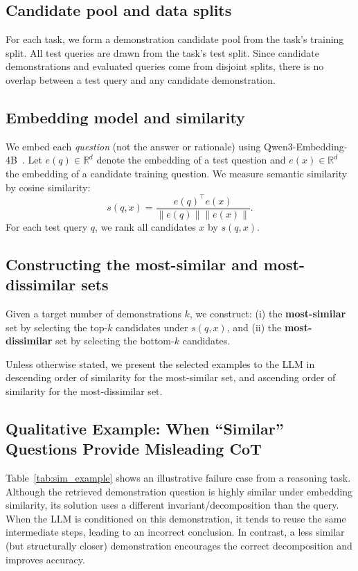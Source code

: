 \documentclass{article}
\theoremstyle{plain}
\theoremstyle{definition}
\theoremstyle{remark}
\begin{document}
\subsection{Candidate pool and data splits}
For each task, we form a demonstration candidate pool from the task's training split. All test queries are drawn from the task's test split.  Since candidate demonstrations and evaluated queries come from disjoint splits, there is no overlap between a test query and any candidate demonstration.

\subsection{Embedding model and similarity}
We embed each \emph{question} (not the answer or rationale) using Qwen3-Embedding-4B~\cite{zhang2025qwen3embeddingadvancingtext}.
Let $e(q)\in\mathbb{R}^d$ denote the embedding of a test question and $e(x)\in\mathbb{R}^d$ the embedding of a candidate training question.
We measure semantic similarity by cosine similarity:
\[
s(q,x) = \frac{e(q)^\top e(x)}{\|e(q)\|\|e(x)\|}.
\]
For each test query $q$, we rank all candidates $x$ by $s(q,x)$.

\subsection{Constructing the most-similar and most-dissimilar sets}
Given a target number of demonstrations $k$, we construct:
(i) the \textbf{most-similar} set by selecting the top-$k$ candidates under $s(q,x)$, and
(ii) the \textbf{most-dissimilar} set by selecting the bottom-$k$ candidates.

Unless otherwise stated, we present the selected examples to the LLM in descending order of similarity for the most-similar set, and ascending order of similarity for the most-dissimilar set.


\subsection{Qualitative Example: When ``Similar'' Questions Provide Misleading CoT}
\label{sec:sim_qual}

Table~\ref{tab:sim_example} shows an illustrative failure case from a reasoning task.
Although the retrieved demonstration question is highly similar under embedding similarity, its solution uses a different invariant/decomposition than the query.
When the LLM is conditioned on this demonstration, it tends to reuse the same intermediate steps, leading to an incorrect conclusion.
In contrast, a less similar (but structurally closer) demonstration encourages the correct decomposition and improves accuracy.
\end{document}
